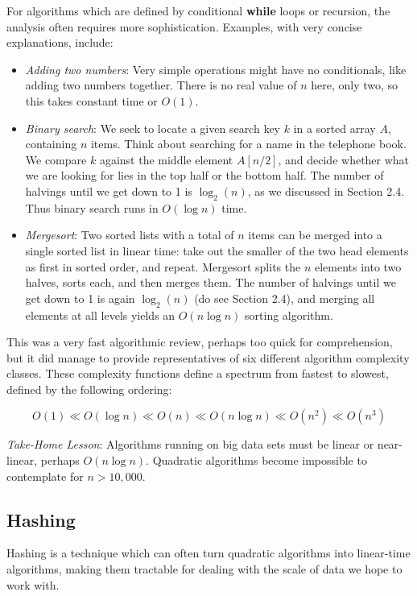 \documentclass[10pt]{article}
\begin{document}
\begin{enumerate}
For algorithms which are defined by conditional \textbf{while} loops or recursion, the analysis often requires more sophistication. Examples, with very concise explanations, include:
\begin{itemize}
    \item \textit{Adding two numbers}: Very simple operations might have no conditionals, like adding two numbers together. There is no real value of $n$ here, only two, so this takes constant time or $O(1)$.
    \item \textit{Binary search}: We seek to locate a given search key $k$ in a sorted array $A$, containing $n$ items. Think about searching for a name in the telephone book. We compare $k$ against the middle element $A[n / 2]$, and decide whether what we are looking for lies in the top half or the bottom half. The number of halvings until we get down to 1 is $\log _{2}(n)$, as we discussed in Section 2.4. Thus binary search runs in $O(\log n)$ time.
    \item \textit{Mergesort}: Two sorted lists with a total of $n$ items can be merged into a single sorted list in linear time: take out the smaller of the two head elements as first in sorted order, and repeat. Mergesort splits the $n$ elements into two halves, sorts each, and then merges them. The number of halvings until we get down to 1 is again $\log _{2}(n)$ (do see Section 2.4), and merging all elements at all levels yields an $O(n \log n)$ sorting algorithm.
\end{itemize}

This was a very fast algorithmic review, perhaps too quick for comprehension, but it did manage to provide representatives of six different algorithm complexity classes. These complexity functions define a spectrum from fastest to slowest, defined by the following ordering:

$$ O(1) \ll O(\log n) \ll O(n) \ll O(n \log n) \ll O(n^{2}) \ll O(n^{3}) $$

\textit{Take-Home Lesson}: Algorithms running on big data sets must be linear or near-linear, perhaps $O(n \log n)$. Quadratic algorithms become impossible to contemplate for $n > 10,000$.

\subsection{Hashing}
Hashing is a technique which can often turn quadratic algorithms into linear-time algorithms, making them tractable for dealing with the scale of data we hope to work with.


\end{enumerate}
\end{document}
